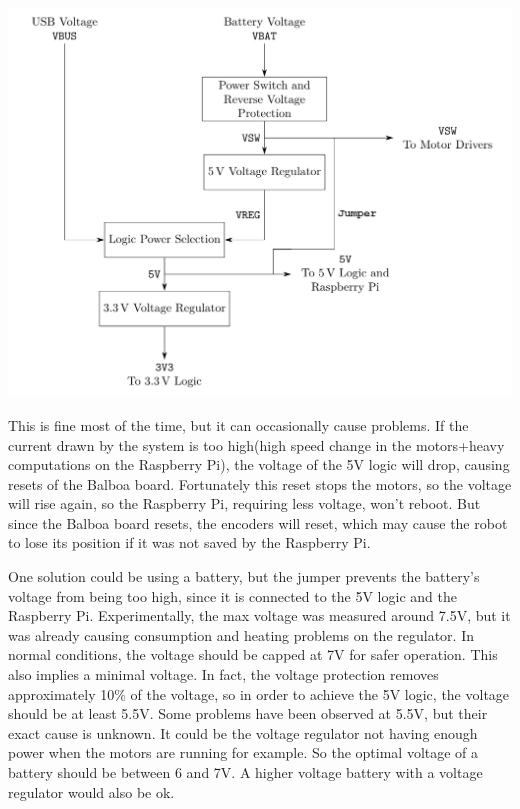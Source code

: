 \documentclass{article}
\begin{document}
\begin{center}
    \includegraphics{img/power.png}
\end{center}

This is fine most of the time, but it can occasionally cause problems.
If the current drawn by the system is too high(high speed change in the motors+heavy 
computations on the Raspberry Pi), the voltage of the 5V logic will drop, causing
resets of the Balboa board. Fortunately this reset stops the motors, so the voltage will rise
again, so the Raspberry Pi, requiring less voltage, won't reboot. But since the Balboa board
resets, the encoders will reset, which may cause the robot to lose its position if it was not
saved by the Raspberry Pi.

One solution could be using a battery, but the jumper prevents the battery's voltage from being
too high, since it is connected to the 5V logic and the Raspberry Pi. Experimentally, the max
voltage was measured around 7.5V, but it was already causing consumption and heating problems on
the regulator. In normal conditions, the voltage should be capped at 7V for safer operation.
This also implies a minimal voltage. In fact, the voltage protection removes approximately 10\%
of the voltage, so in order to achieve the 5V logic, the voltage should be at least 5.5V.
Some problems have been observed at 5.5V, but their exact cause is unknown. It could be the
voltage regulator not having enough power when the motors are running for example.
So the optimal voltage of a battery should be between 6 and 7V. A higher voltage battery
with a voltage regulator would also be ok.
\end{document}
